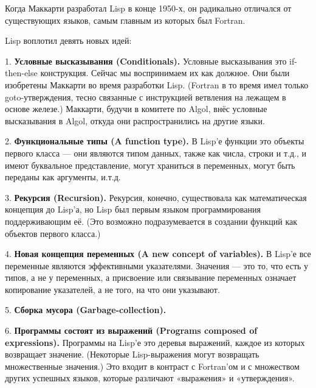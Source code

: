 \documentclass[ebook,12pt,oneside,openany]{memoir}
\date{}
\begin{document}
\maketitle

Когда Маккарти разработал Lisp в конце 1950-х, он радикально отличался
от существующих языков, самым главным из которых был Fortran. \newline

Lisp воплотил девять новых идей: \newline


1. \textbf{Условные высказывания (Conditionals).} Условные высказывания это
if-then-else конструкция. Сейчас мы воспринимаем их как должное. Они
были изобретены Маккарти во время разработки Lisp. (Fortran в то время
имел только goto-утверждения, тесно связанные с инструкцией ветвления
на лежащем в основе железе.) Маккарти, будучи в комитете по Algol,
внёс условные высказывания в Algol, откуда они распространились на
другие языки. \newline

2. \textbf{Функциональные типы (A function type).} В Lisp'е функции это объекты
первого класса — они являются типом данных, также как числа, строки и
т.д., и имеют буквальное представление, могут храниться в переменных,
могут быть переданы как аргументы, и.т.д.\newline

3. \textbf{Рекурсия (Recursion).} Рекурсия, конечно, существовала как
математическая концепция до Lisp'а, но Lisp был первым языком
программирования поддерживающим её. (Это возможно подразумевается в
создании функций как объектов первого класса.)\newline

4. \textbf{Новая концепция переменных (A new concept of variables).} В Lisp'е
все переменные являются эффективными указателями. Значения — это то,
что есть у типов, а не у переменных, а присвоение или связывание
переменных означает копирование указателей, а не того, на что они
указывают.\newline

5. \textbf{Сборка мусора (Garbage-collection).}\newline

6. \textbf{Программы состоят из выражений (Programs composed of expressions).}
Программы на Lisp'е это деревья выражений, каждое из которых
возвращает значение. (Некоторые Lisp-выражения могут возвращать
множественные значения.) Это входит в контраст с Fortran'ом и с
множеством других успешных языков, которые различают «выражения» и
«утверждения».\newline
\end{document}
